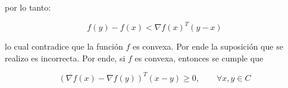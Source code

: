 por lo tanto:

\begin{equation*}
    f(y)-f(x) < \nabla f(x)^T(y-x)
\end{equation*}

lo cual contradice que la función $f$ es convexa. Por ende la suposición que se realizo es incorrecta. Por ende, si $f$ es convexa, entonces se cumple que

\begin{equation*}
    (\nabla f(x)-\nabla f(y))^T (x-y) \geq 0, \qquad \forall x,y \in C
\end{equation*}